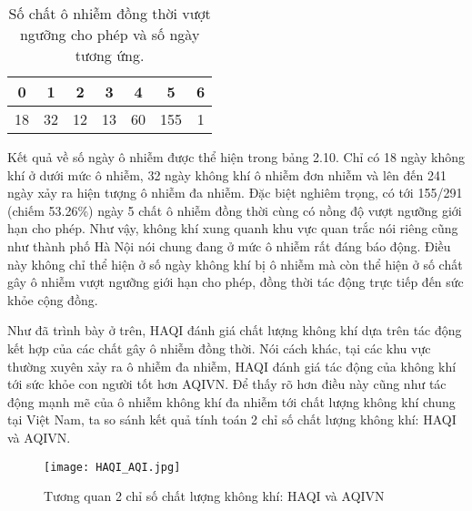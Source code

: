 \documentclass[14pt]{extreport}
\theoremstyle{definition}
\theoremstyle{plain}
\theoremstyle{remark}
\begin{document}
\begin{table}
\begin{tabular}{|c|c|c|c|c|c|c|}
 \hline
 \hspace{0.75cm}0 \hspace{0.75cm} & \hspace{0.8cm}1\hspace{0.8cm} & \hspace{0.8cm}2\hspace{0.8cm} & \hspace{0.8cm}3\hspace{0.8cm} & \hspace{0.8cm}4\hspace{0.8cm} & \hspace{0.8cm}5\hspace*{0.8cm}& \hspace{0.75cm}6\hspace*{0.75cm}\\
 \hline \hline
 18	&	32		&	12	&	13		&	60		&	155 & 1 \\\hline
\end{tabular}
\caption{Số chất ô nhiễm đồng thời vượt ngưỡng cho phép và số ngày tương ứng.}
\end{table}

Kết quả về số ngày ô nhiễm được thể hiện trong bảng 2.10. Chỉ có 18 ngày không khí ở dưới mức ô nhiễm, 32 ngày không khí ô nhiễm đơn nhiễm và lên đến 241 ngày xảy ra hiện tượng ô nhiễm đa nhiễm. Đặc biệt nghiêm trọng, có tới 155/291 (chiếm 53.26\%) ngày 5 chất ô nhiễm đồng thời cùng có nồng độ vượt ngưỡng giới hạn cho phép. Như vậy, không khí xung quanh khu vực quan trắc nói riêng cũng như thành phố Hà Nội nói chung đang ở mức ô nhiễm rất đáng báo động. Điều này không chỉ thể hiện ở số ngày không khí bị ô nhiễm mà còn thể hiện ở số chất gây ô nhiễm vượt ngưỡng giới hạn cho phép, đồng thời tác động trực tiếp đến sức khỏe cộng đồng.

Như đã trình bày ở trên, HAQI đánh giá chất lượng không khí dựa trên tác động kết hợp của các chất gây ô nhiễm đồng thời. Nói cách khác, tại các khu vực thường xuyên xảy ra ô nhiễm đa nhiễm, HAQI đánh giá tác động của không khí tới sức khỏe con người tốt hơn AQIVN. Để thấy rõ hơn điều này cũng như tác động mạnh mẽ của ô nhiễm không khí đa nhiễm tới chất lượng không khí chung tại Việt Nam, ta so sánh kết quả tính toán 2 chỉ số chất lượng không khí: HAQI và AQIVN.

\begin{figure}
\begin{center}
\texttt{[image: HAQI\_AQI.jpg]}
\end{center}
\caption{Tương quan 2 chỉ số chất lượng không khí: HAQI và AQIVN}
\end{figure}
\end{document}
